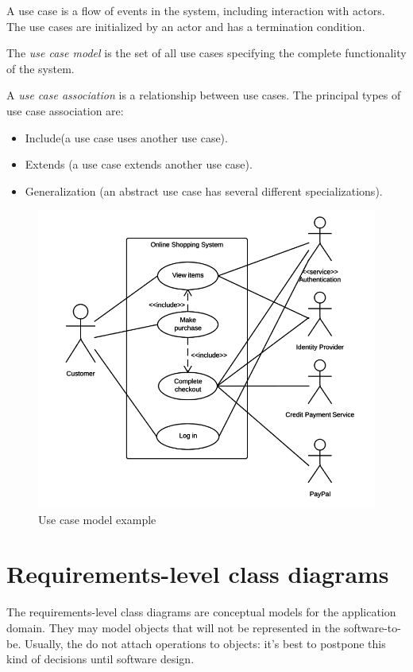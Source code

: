 \documentclass[12pt, a4paper]{report}
\newtheorem[style=M,bodystyle=\normalfont]{theorem}{Theorem}
\newtheorem[style=M,bodystyle=\normalfont]{corollary}{Corollary}
\newtheorem[style=M,bodystyle=\normalfont]{lemma}{Lemma}
\newtheorem[style=M,bodystyle=\normalfont]{definition}{Definition}
\begin{document}
    A use case is a flow of events in the system, including interaction with actors. The use cases are initialized by an actor and has a termination condition. 
    \begin{definition}
        The \emph{use case model} is the set of all use cases specifying the complete functionality of the system. 
    \end{definition}
    \begin{definition}
        A \emph{use case association} is a relationship between use cases. The principal types of use case association are: 
        \begin{itemize}
            \item Include(a use case uses another use case).
            \item Extends (a use case extends another use case).
            \item Generalization (an abstract use case has several different specializations).
        \end{itemize}
    \end{definition}
    \begin{figure}[H]
        \centering
        \includegraphics[width=0.5\linewidth]{images/usecase.png}
        \caption{Use case model example}
    \end{figure}
\section{Requirements-level class diagrams}
    The requirements-level class diagrams are conceptual models for the application domain. They may model objects that will not be represented in the software-to-be. Usually, the 
    do not attach operations to objects: it's best to postpone this kind of decisions until software design. 
     
\end{document}
